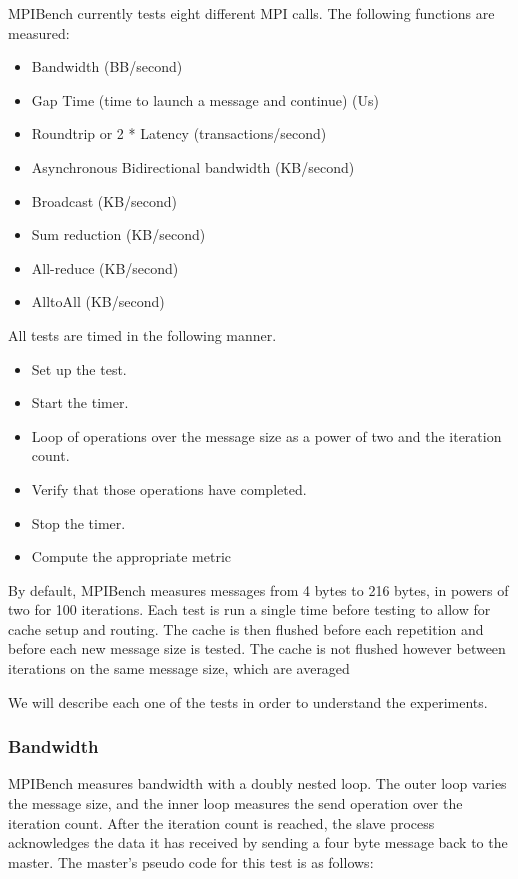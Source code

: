 MPIBench currently tests eight different MPI calls. The following functions are
measured:

\begin{itemize}
    \item Bandwidth (BB/second)
    \item Gap Time (time to launch a message and continue) (Us)
    \item Roundtrip or 2 * Latency (transactions/second)
    \item Asynchronous Bidirectional bandwidth (KB/second)
    \item Broadcast (KB/second)
    \item Sum reduction (KB/second)
    \item All-reduce (KB/second)
    \item AlltoAll (KB/second)
\end{itemize}



All tests are timed in the following manner.

\begin{itemize}
    \item Set up the test.
    \item Start the timer.
    \item Loop of operations over the message size as a power of two and the
iteration count.
    \item Verify that those operations have completed.
    \item Stop the timer.
    \item Compute the appropriate metric
\end{itemize}

By default, MPIBench measures messages from 4 bytes to 216 bytes, in powers of
two for 100 iterations. Each test is run a single time before testing to allow
for cache setup and routing. The cache is then flushed before each repetition
and before each new message size is tested. The cache is not flushed however
between iterations on the same message size, which are averaged

We will describe each one of the tests in order to understand the experiments.


\subsubsection{Bandwidth}

MPIBench measures bandwidth with a doubly nested loop. The outer loop varies the
message size, and the inner loop measures the send operation over the
iteration count. After the iteration count is reached, the slave process
acknowledges the data it has received by sending a four byte message back to
the master. The master's pseudo code for this test is as follows:

